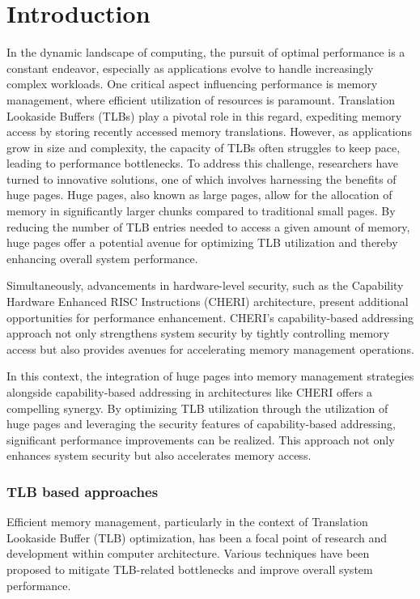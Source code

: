 \chapter{Introduction}
In the dynamic landscape of computing, the pursuit of optimal performance is a constant endeavor, 
especially as applications evolve to handle increasingly complex workloads. 
One critical aspect influencing performance is memory management, where efficient 
utilization of resources is paramount. Translation Lookaside Buffers (TLBs) play a 
pivotal role in this regard, expediting memory access by storing recently accessed memory translations.
However, as applications grow in size and complexity, the capacity of TLBs often struggles to 
keep pace, leading to performance bottlenecks. To address this challenge, researchers have 
turned to innovative solutions, one of which involves harnessing the benefits of huge pages.
Huge pages, also known as large pages, allow for the allocation of memory in significantly 
larger chunks compared to traditional small pages. By reducing the number of TLB entries 
needed to access a given amount of memory, huge pages offer a potential avenue for optimizing 
TLB utilization and thereby enhancing overall system performance.

Simultaneously, advancements in hardware-level security, such as the Capability Hardware 
Enhanced RISC Instructions (CHERI) architecture, present additional opportunities for 
performance enhancement. CHERI's capability-based addressing approach not only strengthens 
system security by tightly controlling memory access but also provides avenues for 
accelerating memory management operations.

In this context, the integration of huge pages into memory management 
strategies alongside capability-based addressing in architectures like 
CHERI offers a compelling synergy. By optimizing TLB utilization through the 
utilization of huge pages and leveraging the security features of capability-based addressing, 
significant performance improvements can be realized. This approach not only enhances 
system security but also accelerates memory access.

\subsection{TLB based approaches}
Efficient memory management, particularly in the context of 
Translation Lookaside Buffer (TLB) optimization, has been a focal point of 
research and development within computer architecture. Various techniques have been 
proposed to mitigate TLB-related bottlenecks and improve overall system performance.

